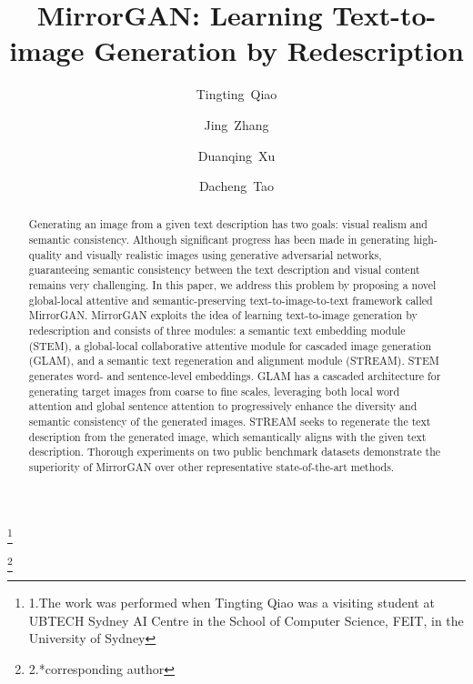 \documentclass[10pt,twocolumn,letterpaper]{article}
\newcommand\blfootnote[1]{\begingroup
  \renewcommand\thefootnote{}\footnote{#1}\addtocounter{footnote}{-1}\endgroup
}
\begin{document}
\title{MirrorGAN: Learning Text-to-image Generation by Redescription}

\author[1,3]{\normalsize{Tingting~Qiao}}
\author[2,3,*]{\normalsize{Jing~Zhang}}
\author[1,*]{\normalsize{Duanqing~Xu}}
\author[3]{\normalsize{Dacheng~Tao}}
\maketitle


\begin{abstract}
Generating an image from a given text description has two goals: visual realism and semantic consistency. Although significant progress has been made in generating high-quality and visually realistic images using generative adversarial networks, guaranteeing semantic consistency between the text description and visual content remains very challenging. In this paper, we address this problem by proposing a novel global-local attentive and semantic-preserving text-to-image-to-text framework called MirrorGAN. MirrorGAN exploits the idea of learning text-to-image generation by redescription and consists of three modules: a semantic text embedding module (STEM), a global-local collaborative attentive module for cascaded image generation (GLAM), and a semantic text regeneration and alignment module (STREAM). STEM generates word- and sentence-level embeddings. GLAM has a cascaded architecture for generating target images from coarse to fine scales, leveraging both local word attention and global sentence attention to progressively enhance the diversity and semantic consistency of the generated images. STREAM seeks to regenerate the text description from the generated image, which semantically aligns with the given text description. Thorough experiments on two public benchmark datasets demonstrate the superiority of MirrorGAN over other representative state-of-the-art methods. 
\end{abstract}
\blfootnote{1.The work was performed when Tingting Qiao was a visiting student at UBTECH Sydney AI Centre in the School of Computer Science, FEIT, in the University of Sydney}
\blfootnote{2.*corresponding author}
\end{document}
